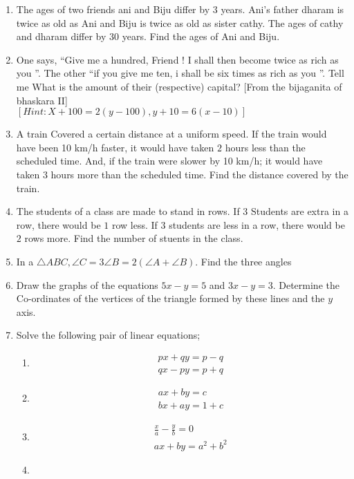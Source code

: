 \begin{enumerate}
\item The ages of two friends ani and Biju differ  by $3$  years. Ani's father dharam is twice as old as Ani and Biju is twice as old as sister cathy. The ages of cathy and dharam differ by $30$ years. Find the ages of Ani and Biju.
\item  One says, \textquotedblleft Give me a hundred, Friend !  I shall then become twice as rich as you \textquotedblright. The other \textquotedblleft  if you give me ten, i shall be six times as rich as you \textquotedblright.  Tell me What is the amount of their (respective) capital? [From the bijaganita of bhaskara II] 
\\ $[Hint: X+100=2(y-100), y+10=6(x-10)]$
\item A train Covered a certain distance at a uniform speed. If the train would have been 10 km/h faster, it would have taken $2$ hours less than the scheduled time. And, if the train were slower by 10 km/h; it would have taken $3$ hours more than the scheduled time. Find the distance covered by the train.
\item The students of a class are made to stand in rows. If 3 Students are extra in a row, there would be $1$ row less. If $3$ students are less in a row, there would be $2$ rows more. Find the number of stuents in the class.
\item In a $\triangle ABC, \angle C=3 \angle B=2(\angle A+\angle B)$. Find the three angles
\item Draw the graphs of the equations $5x-y=5$ and $3x-y=3$. Determine the Co-ordinates of the vertices of the triangle formed by these lines and the $y$ axis.
\item Solve the following pair of linear equations;
\begin{enumerate}
\item
\begin{align}
px+qy=p-q\\ qx-py=p+q
\end{align}
\item
\begin{align}                                                   
ax+by=c\\ bx+ay=1+c
\end{align}
\item 
\begin{align}
\frac {x}{a}-\frac{y}{b}=0\\ ax+by=a^2+b^2
\end{align}
\item

\end{enumerate}
\end{enumerate}
